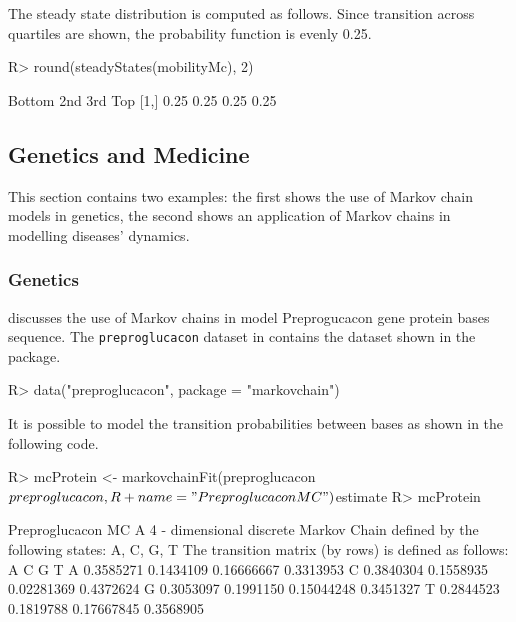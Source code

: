 \documentclass[article,nojss]{jss}
\begin{document}
The steady state distribution is computed as follows. Since transition across quartiles are shown, the probability function is evenly 0.25.

\begin{CodeChunk}

\begin{CodeInput}
R> round(steadyStates(mobilityMc), 2)
\end{CodeInput}

\begin{CodeOutput}
     Bottom  2nd  3rd  Top
[1,]   0.25 0.25 0.25 0.25
\end{CodeOutput}
\end{CodeChunk}

\hypertarget{sec:gen}{%
\subsection{Genetics and Medicine}\label{sec:gen}}

This section contains two examples: the first shows the use of Markov chain models in genetics, the second shows an application of Markov chains in modelling diseases' dynamics.

\hypertarget{sec:genetics}{%
\subsubsection{Genetics}\label{sec:genetics}}

\cite{averyHenderson} discusses the use of Markov chains in model Preprogucacon gene protein bases sequence. The \texttt{preproglucacon} dataset in  contains the dataset shown in the package.

\begin{CodeChunk}

\begin{CodeInput}
R> data("preproglucacon", package = "markovchain")
\end{CodeInput}
\end{CodeChunk}

It is possible to model the transition probabilities between bases as shown in the following code.

\begin{CodeChunk}

\begin{CodeInput}
R> mcProtein <- markovchainFit(preproglucacon$preproglucacon, 
R+                           name = "Preproglucacon MC")$estimate
R> mcProtein
\end{CodeInput}

\begin{CodeOutput}
Preproglucacon MC 
 A  4 - dimensional discrete Markov Chain defined by the following states: 
 A, C, G, T 
 The transition matrix  (by rows)  is defined as follows: 
          A         C          G         T
A 0.3585271 0.1434109 0.16666667 0.3313953
C 0.3840304 0.1558935 0.02281369 0.4372624
G 0.3053097 0.1991150 0.15044248 0.3451327
T 0.2844523 0.1819788 0.17667845 0.3568905
\end{CodeOutput}
\end{CodeChunk}
\end{document}
